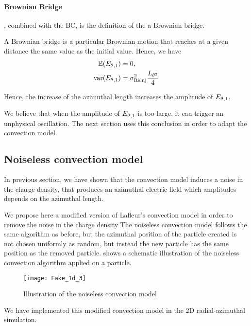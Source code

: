     \paragraph{Brownian Bridge\\}
      , combined with the \ac{BC}, is the definition of the a Brownian bridge.
      
      A Brownian bridge is a particular Brownian motion that reaches at a given distance the same value as the initial value.
      Hence, we have \citep{ibe2013}
      \begin{align*}
        \mathbb{E}({E_{\theta}}_{, 1}) &= 0,  \\
        {\rm var}({E_{\theta}}_{, 1}) &= \sigma_{\rm Reinj}^2 \frac{L_{\theta^2}}{4}
      \end{align*}
    
      Hence, the increase of the azimuthal length increases the amplitude of ${E_{\theta}}_{, 1}$.
      
    
    We believe that when the amplitude of ${E_{\theta}}_{, 1}$ is too large, it can trigger an unphysical oscillation.
    The next section uses this conclusion in order to adapt the convection model.
    
    \subsection{Noiseless convection model}
      \label{sec-noiselessresults}
      In previous section, we have shown that the convection model induces a noise in the charge density, that produces an azimuthal electric field which amplitudes depends on the azimuthal length.
      
      We propose here a modified version of Lafleur's convection model in order to remove the noise in the charge density
      The noiseless convection model follows the same algorithm as before, but the azimuthal position of the particle created is not chosen uniformly as random, but instead the new particle has the same position as the removed particle.
       shows a schematic illustration of the noiseless convection algorithm applied on a particle.
      
      \begin{figure}[hbt]
        \centering
        \texttt{[image: Fake\_1d\_3]}
        \caption{Illustration of the noiseless convection model}
        \label{fig-fakez3}
      \end{figure}
      
      We have implemented this modified convection model in the \ac{2D} radial-azimuthal simulation.
      
